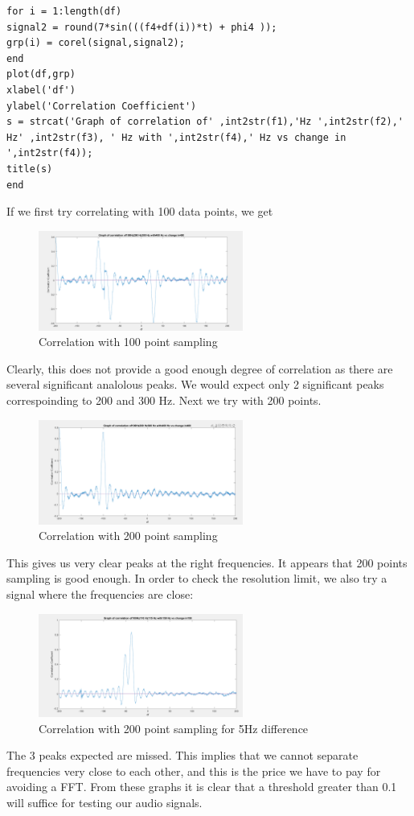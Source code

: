 \begin{itemize}
\begin{lstlisting}
for i = 1:length(df)
signal2 = round(7*sin(((f4+df(i))*t) + phi4 ));
grp(i) = corel(signal,signal2);
end
plot(df,grp)
xlabel('df')
ylabel('Correlation Coefficient')
s = strcat('Graph of correlation of' ,int2str(f1),'Hz ',int2str(f2),' Hz' ,int2str(f3), ' Hz with ',int2str(f4),' Hz vs change in ',int2str(f4));
title(s)
end
\end{lstlisting}
If we first try correlating with 100 data points, we get \\
\begin{figure}[ht]
    \centering
    \includegraphics[width=0.6\textwidth]{fig/Graph2100pts.PNG}
    \caption{Correlation with 100 point sampling}
    \label{fig:100pts}
\end{figure}
Clearly, this does not provide a good enough degree of correlation as there are
several significant analolous peaks. We would expect only 2 significant peaks
correspoinding to 200 and 300 Hz. Next we try with 200 points. 
\begin{figure}[ht]
    \centering
    \includegraphics[width=0.6\textwidth]{fig/Graph1.PNG}
    \caption{Correlation with 200 point sampling}
    \label{fig:100pts}
\end{figure}
This gives us very clear peaks at the right frequencies. It appears that 200
points sampling is good enough. In order to check the resolution limit, we also
try a signal where the frequencies are close: 
\begin{figure}[ht]
    \centering
    \includegraphics[width=0.6\textwidth]{fig/LowResolutionGraph3200ots.PNG}
    \caption{Correlation with 200 point sampling for 5Hz difference}
    \label{fig:200ptslowres}
\end{figure}
The 3 peaks expected are missed. This implies that we cannot separate
frequencies very close to each other, and this is the price we have to pay for
avoiding a FFT. From these graphs it is clear that a threshold greater than 0.1
will suffice for testing our audio signals. 

\end{itemize}